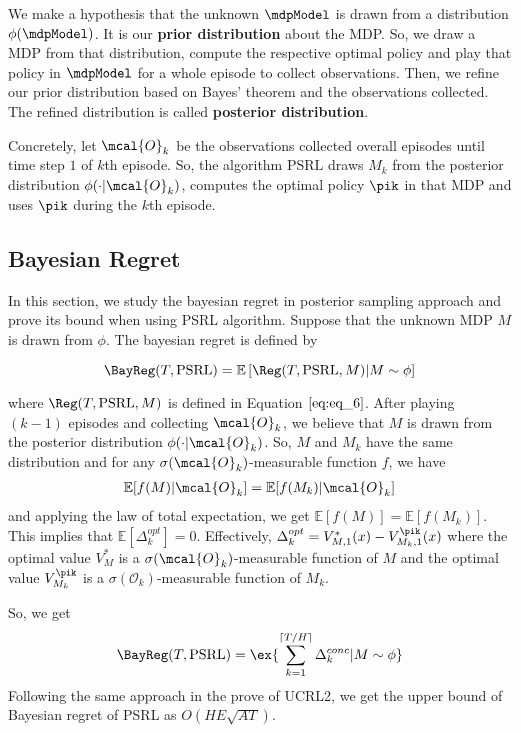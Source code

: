     We make a hypothesis that the unknown $\mdpModel$ is drawn from a distribution $\phi(\mdpModel)$. It is our \textbf{prior distribution} about the MDP. So, we draw a MDP from that distribution, compute the respective optimal policy and play that policy in $\mdpModel$ for a whole episode to collect observations. Then, we refine our prior distribution based on Bayes' theorem and the observations collected. The refined distribution is called \textbf{posterior distribution}.
    
    Concretely, let $\mcal{O}_k$ be the observations collected overall episodes until time step $1$ of $k$th episode. So, the algorithm $\mathrm{PSRL}$ draws $M_k$ from the posterior distribution $\phi(\cdot|\mcal{O}_k)$, computes the optimal policy $\pik$ in that MDP and uses $\pik$ during the $k$th episode.
    
    \subsection{Bayesian Regret}
    \label{subsec:regret_psrl}
    
    In this section, we study the bayesian regret in posterior sampling approach and prove its bound when using PSRL algorithm. Suppose that the unknown MDP $M$ is drawn from $\phi$. The bayesian regret is defined by
    
    $$\BayReg(T,\mathrm{PSRL})=\mathbb{E}\left[\Reg(T,\mathrm{PSRL},M) |M\sim\phi\right]$$
    
    where $\Reg(T,\mathrm{PSRL},M)$ is defined in Equation$~\eqref{eq:eq_6}$. After playing $(k-1)$ episodes and collecting $\mcal{O}_{k}$, we believe that $M$ is drawn from the posterior distribution $\phi(\cdot|\mcal{O}_{k})$. So, $M$ and $M_k$ have the same distribution and for any $\sigma(\mcal{O}_{k})$-measurable function $f$, we have
    \begin{align*}
    \mathbb{E}[f(M)|\mcal{O}_{k}] =\mathbb{E}[f(M_k)|\mcal{O}_{k}]
    \end{align*}
    and applying the law of total expectation, we get $\mathbb{E}[f(M)] =\mathbb{E}[f(M_k)]$. This implies that $\mathbb{E}[\Delta_k^{opt}]=0$. Effectively, $\Delta_k^{opt}=V^*_{M,1}(x) -V^{\pik}_{M_k,1}(x)$ where the optimal value $V^*_M$ is a $\sigma(\mcal{O}_{k})$-measurable function of $M$ and the optimal value $V^{\pik}_{M_k}$ is a $\sigma(\mathcal{O}_{k})$-measurable function of $M_k$.
    
    So, we get
    \begin{align*}
    \BayReg(T,\mathrm{PSRL}) =\ex{\sum_{k=1}^{\lceil T/H\rceil}\Delta_k^{conc} |M\sim\phi}
    \end{align*}
    Following the same approach in the prove of UCRL2, we get the upper bound of Bayesian regret of PSRL as $O(HE\sqrt{AT})$.
    
